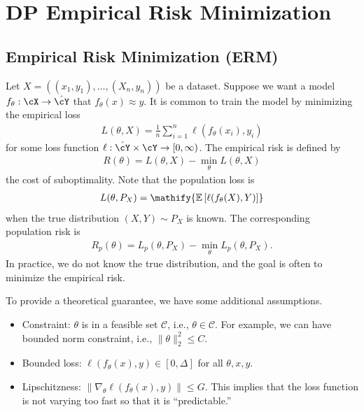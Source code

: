 \documentclass[11pt, a4paper]{article}
\newcommand{\E}[1]{\mathify{\mathbb{E}\left[#1\right]}}
\begin{document}
\section{DP Empirical Risk Minimization}
\subsection{Empirical Risk Minimization (ERM)}
Let $X = ((x_1, y_1), \dots, (X_n, y_n))$ be a dataset.
Suppose we want a model $f_\theta:\cX\rightarrow \hat{\cY}$ that $f_{\theta}(x) \approx y$.
It is common to train the model by minimizing the empirical loss
\begin{align}
    L(\theta, X) = \frac{1}{n}\sum_{i=1}^n \ell(f_{\theta}(x_i), y_i)
\end{align}
for some loss function $\ell: \hat{\cY}\times \cY\rightarrow [0, \infty)$.
The empirical risk is defined by
\begin{align}
    R(\theta) = L(\theta, X) - \min_\theta L(\theta, X)
\end{align}
the cost of suboptimality.
Note that the population loss is
\begin{align}
    L(\theta, P_X) = \E{\ell(f_{\theta}(X), Y)}
\end{align}
when the true distribution $(X, Y)\sim P_X$ is known.
The corresponding population risk is
\begin{align}
    R_p(\theta) = L_p(\theta, P_X) - \min_\theta L_p(\theta, P_X).
\end{align}
In practice, we do not know the true distribution, and the goal is often to minimize the empirical risk.

To provide a theoretical guarantee, we have some additional assumptions.
\begin{itemize}
    \item Constraint: $\theta$ is in a feasible set $\mathcal{C}$, i.e., $\theta\in\mathcal{C}$.
        For example, we can have bounded norm constraint, i.e., $\|\theta\|_2^2\leq C$.
    \item Bounded loss: $\ell(f_{\theta}(x), y) \in [0, \Delta]$ for all $\theta, x, y$.
    \item Lipschitzness: $\|\nabla_\theta \ell(f_\theta(x), y)\|\leq G$.
        This implies that the loss function is not varying too fast so that it is ``predictable.''
\end{itemize}
\end{document}
